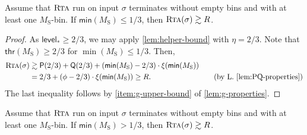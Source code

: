 \documentclass[a4paper,USenglish,cleveref]{lipics-v2019}
\newcommand{\R}{\ensuremath{R}}
\newcommand{\M}{\ensuremath{M_\mathrm{S}}\xspace}
\newcommand{\smallBoundary}{\ensuremath{\phi}}
\newcommand{\g}{\ensuremath{\xi}}
\newcommand{\water}{\textsf{Q}}
\newcommand{\cutintegral}{\textsf{P}}
\newcommand{\thresh}{\textsf{thr}(\M)}
\newcommand{\level}{\textsf{level}_*}
\newcommand{\mn}{\textsf{min}}
\newcommand{\ALG}{\textsc{Rta}\xspace}
\begin{document}
\begin{lemma}
\label{lem:small-ms}
Assume that $\ALG$ run on input $\sigma$ terminates 
without empty bins and with at least one \M-bin.
If $\mn(\M) \leq 1/3$, then $\ALG(\sigma) \gtrsim \R$.
\end{lemma}


\begin{proof}
As $\level \geq 2/3$, we may apply \cref{lem:helper-bound} 
with $\eta = 2/3$. Note that $\thresh \geq 2/3$ for $\min(\M) \leq 1/3$. Then,
\begin{align*}
  \ALG(\sigma)
  & \gtrsim \cutintegral(2/3) + \water(2/3) + (\mn(\M) - 2/3) \cdot \g(\mn(\M)) \\
  & = 2/3 + (\smallBoundary - 2/3) \cdot \g(\mn(\M)) \geq \R.
      &&& \text{(by L.~\ref{lem:PQ-properties})} 
\end{align*}
The last inequality follows by \cref{item:g-upper-bound} of \cref{lem:g-properties}.
\end{proof} 


\begin{lemma}
\label{lem:large-ms}
Assume that $\ALG$ run on input $\sigma$ terminates 
without empty bins and with at least one \M-bin.
If $\mn(\M) > 1/3$, then $\ALG(\sigma) \gtrsim \R$.
\end{lemma}
\end{document}
